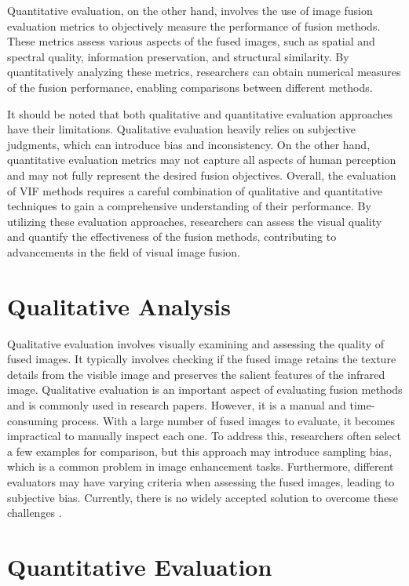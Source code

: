 Quantitative evaluation, on the other hand, involves the use of image fusion evaluation metrics to objectively measure the performance of fusion methods. These metrics assess various aspects of the fused images, such as spatial and spectral quality, information preservation, and structural similarity. By quantitatively analyzing these metrics, researchers can obtain numerical measures of the fusion performance, enabling comparisons between different methods.

It should be noted that both qualitative and quantitative evaluation approaches have their limitations. Qualitative evaluation heavily relies on subjective judgments, which can introduce bias and inconsistency. On the other hand, quantitative evaluation metrics may not capture all aspects of human perception and may not fully represent the desired fusion objectives. Overall, the evaluation of VIF methods requires a careful combination of qualitative and quantitative techniques to gain a comprehensive understanding of their performance. By utilizing these evaluation approaches, researchers can assess the visual quality and quantify the effectiveness of the fusion methods, contributing to advancements in the field of visual image fusion.

\section{Qualitative Analysis}

Qualitative evaluation involves visually examining and assessing the quality of fused images. It typically involves checking if the fused image retains the texture details from the visible image and preserves the salient features of the infrared image. Qualitative evaluation is an important aspect of evaluating fusion methods and is commonly used in research papers. However, it is a manual and time-consuming process. With a large number of fused images to evaluate, it becomes impractical to manually inspect each one. To address this, researchers often select a few examples for comparison, but this approach may introduce sampling bias, which is a common problem in image enhancement tasks. Furthermore, different evaluators may have varying criteria when assessing the fused images, leading to subjective bias. Currently, there is no widely accepted solution to overcome these challenges \cite{peibei2021debiased}.

\section{Quantitative Evaluation}

